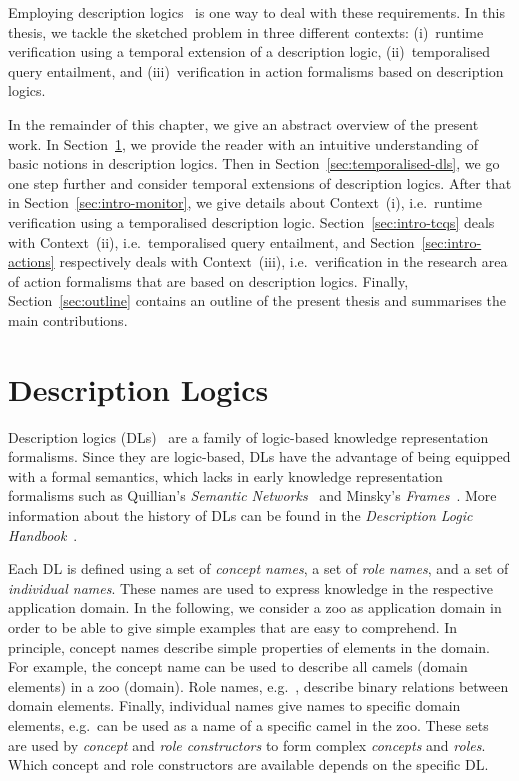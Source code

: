 Employing description logics~\cite{DLhandbook-07} is one way to deal with these
requirements.  In this thesis, we tackle the sketched problem in three different
contexts: (i)~runtime verification using a temporal extension of a description
logic, (ii)~temporalised query entailment, and (iii)~verification in action
formalisms based on description logics.

In the remainder of this chapter, we give an abstract overview of the present
work.  In Section~\ref{sec:intro-dls}, we provide the reader with an intuitive
understanding of basic notions in description logics.  Then in
Section~\ref{sec:temporalised-dls}, we go one step further and consider temporal
extensions of description logics.  After that in
Section~\ref{sec:intro-monitor}, we give details about Context~(i), i.e.~runtime
verification using a temporalised description logic.
Section~\ref{sec:intro-tcqs} deals with Context~(ii), i.e.~temporalised query
entailment, and Section~\ref{sec:intro-actions} respectively deals with
Context~(iii), i.e.~verification in the research area of action formalisms that
are based on description logics.  Finally, Section~\ref{sec:outline} contains an
outline of the present thesis and summarises the main contributions.


\section{Description Logics}\label{sec:intro-dls}

Description logics (DLs)~\cite{DLhandbook-07} are a family of logic-based
knowledge representation formalisms.  Since they are logic-based, DLs have the
advantage of being equipped with a formal semantics, which lacks in early
knowledge representation formalisms such as Quillian's \emph{Semantic
Networks}~\cite{Qui-BS67} and Minsky's \emph{Frames}~\cite{Min-MD81}.
%
More information about the history of DLs can be found in the \emph{Description
Logic Handbook}~\cite{DLhandbook-07}.

Each DL is defined using a set of \emph{concept names}, a set of  \emph{role
names}, and a set of \emph{individual names}.  These names are used to express
knowledge in the respective application domain.  In the following, we consider a
zoo as application domain in order to be able to give simple examples that are
easy to comprehend.
%
In principle, concept names describe simple properties of elements in the
domain.  For example, the concept name \Camel can be used to describe all camels
(domain elements) in a zoo (domain).  Role names, e.g.\ \isFatherOf, describe
binary relations between domain elements.  Finally, individual names give names
to specific domain elements, e.g.\ \leah can be used as a name of a specific
camel in the zoo.
%
These sets are used by \emph{concept} and \emph{role constructors} to form
complex \emph{concepts} and \emph{roles}.  Which concept and role constructors
are available depends on the specific DL\@.

